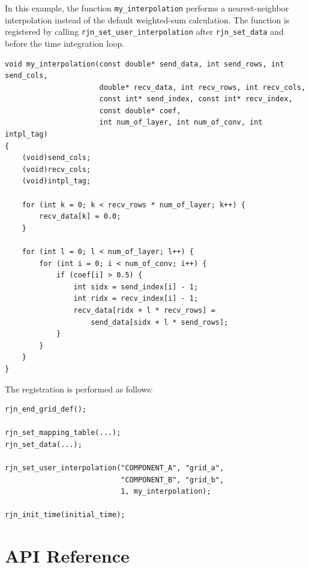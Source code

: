 \documentclass[11pt,a4paper]{report}
\begin{document}
In this example, the function \texttt{my\_interpolation}
performs a nearest-neighbor interpolation
instead of the default weighted-sum calculation.
The function is registered
by calling \texttt{rjn\_set\_user\_interpolation}
after \texttt{rjn\_set\_data}
and before the time integration loop.

\begin{lstlisting}[caption=Example of user-defined interpolation registration,
                    label=list:user_intpl_example]
void my_interpolation(const double* send_data, int send_rows, int send_cols,
                      double* recv_data, int recv_rows, int recv_cols,
                      const int* send_index, const int* recv_index,
                      const double* coef,
                      int num_of_layer, int num_of_conv, int intpl_tag)
{
    (void)send_cols;
    (void)recv_cols;
    (void)intpl_tag;

    for (int k = 0; k < recv_rows * num_of_layer; k++) {
        recv_data[k] = 0.0;
    }

    for (int l = 0; l < num_of_layer; l++) {
        for (int i = 0; i < num_of_conv; i++) {
            if (coef[i] > 0.5) {
                int sidx = send_index[i] - 1;
                int ridx = recv_index[i] - 1;
                recv_data[ridx + l * recv_rows] =
                    send_data[sidx + l * send_rows];
            }
        }
    }
}
\end{lstlisting}

The registration is performed as follows:

\begin{lstlisting}[caption=Registering the user-defined subroutine,
                    label=list:user_intpl_register]
rjn_end_grid_def();

rjn_set_mapping_table(...);
rjn_set_data(...);

rjn_set_user_interpolation("COMPONENT_A", "grid_a",
                           "COMPONENT_B", "grid_b",
                           1, my_interpolation);

rjn_init_time(initial_time);
\end{lstlisting}


\chapter{API Reference}
\end{document}
